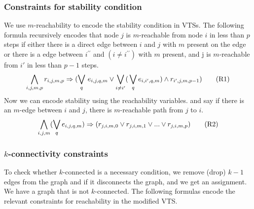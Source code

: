 
\subsubsection{Constraints for stability condition}
%
We use $m$-reachability to encode the stability condition in VTSs.
%
The following formula recursively encodes that node $j$ is $m$-reachable from node $i$ in less than $p$ steps
if either there is a direct edge between $i$ and $j$ with $m$ present on the edge or there is a edge between $i^{\prime \prime}$ and
$(i \neq i^{\prime \prime})$ with $m$ present, and j is $m$-reachable from $i'$ in less than $p-1$ steps.
%
\begin{align}
  \bigwedge\limits_{i,j,m,p} r_{i,j,m,p} \Rightarrow (\bigvee_{q} \, e_{i,j,q,m} \lor \bigvee_{i\neq i^{\prime}} ( \, \bigvee_{q} e_{i,i^{\prime},q,m}) \land r_{i^{\prime},j,m,p-1} )
  \tag{R1}\label{eq:reach1}
\end{align}
Now we can encode stability using the reachability variables.
and say if there is an $m$-edge between $i$ and $j$, there is
$m$-reachable path from $j$ to $i$.
\begin{align}
 \bigwedge\limits_{i,j,m} (\bigvee_{q} e_{i,j,q,m}) \Rightarrow (r_{j,i,m,0}  \lor r_{j,i,m,1} \lor ... \lor r_{j,i,m,p})  
  \tag{R2}\label{eq:reach2}
\end{align}







\subsubsection{$k$-connectivity constraints}
To check whether $k$-connected is a necessary condition, we remove (drop) $k-1$ edges from the graph and if it
disconnects the graph, and we get an assignment. We have a graph that is not  $k$-connected.
The following formulas encode the relevant constraints for reachability in the modified VTS. 

